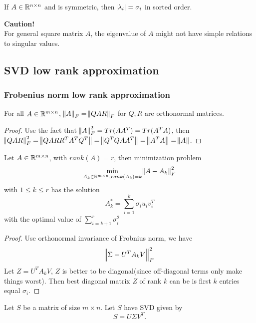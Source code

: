 \begin{refsection}
\begin{corollary}
	If $A \in \mathbb{R}^{n\times n}$ and is symmetric, then $\abs{\lambda_i} = \sigma_i$ in sorted order.
\end{corollary}


\begin{mdframed}
	\textbf{Caution!}\\
	For general square matrix $A$, the eigenvalue of $A$ might not have simple relations to singular values. 
\end{mdframed}


\subsection{SVD low rank approximation}


\subsubsection{Frobenius norm low rank approximation}
\begin{lemma}
For all $A\in \mathbb{R}^{m\times n}$, $\norm{A}_F = \norm{QAR}_F$ for $Q,R$ are orthonormal matrices. 
\end{lemma}
\begin{proof}
Use the fact that $\norm{A}_F^2 = Tr(AA^T) = Tr(A^TA)$, then $\norm{QAR}_F^2 = \norm{QARR^TA^TQ^T} = \norm{Q^TQAA^T} = \norm{A^TA} = \norm{A}$.
\end{proof}

\begin{theorem}\label{ch:linearalgebra:th:SVDFrobeniusnormlowrankapproximation}
\cite[153]{calafiore2014optimization}Let $A \in \mathbb{R}^{m\times n}$, with $rank(A)=r$, then minimization problem
$$\min_{A_k \in \mathbb{R}^{m\times n},rank(A_k)=k} \norm{A-A_k}^2_F$$
with $1\leq k\leq r$ has the solution
$$A_k^* = \sum_{i=1}^k \sigma_i u_i v_i^T$$
with the optimal value of $\sum_{i=k+1}^r \sigma^2_i$
\end{theorem}
\begin{proof}
Use orthonormal invariance of Frobnius norm, we have $$\norm{\Sigma - U^TA_kV}_F^2$$
Let $Z = U^TA_kV$, $Z$ is better to be diagonal(since off-diagonal terms only make things worst). Then best diagonal matrix $Z$ of rank $k$ can be is first $k$ entries equal $\sigma_i$.
\end{proof}

\begin{corollary}
Let $S$ be a matrix of size $m\times n$. Let $S$ have SVD given by
$$S = U\Sigma V^T.$$


\end{corollary}
\end{refsection}
